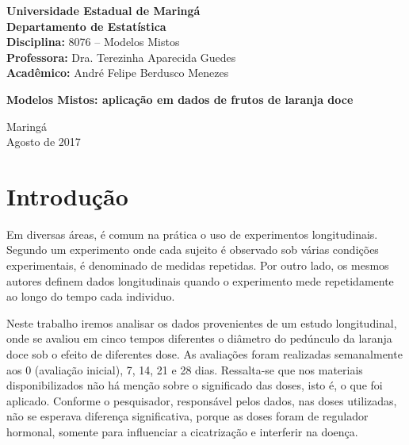 \documentclass[12pt,a4paper,final]{article}
\begin{document}
\begin{titlepage}
	\begin{flushleft}
		\Large\textbf{Universidade Estadual de Maringá} \\
		\large\textbf{Departamento de Estatística} \\
		\textbf{Disciplina:} 8076 -- Modelos Mistos\\
		\textbf{Professora:} Dra. Terezinha Aparecida Guedes \\
		\textbf{Acadêmico:} André Felipe Berdusco Menezes 
	\end{flushleft}
	
	\vspace{180pt}
	\begin{center}
		\LARGE\textbf{Modelos Mistos: aplicação em dados de frutos de laranja doce}
	\end{center}
	
	\vspace{78pt}
	\begin{center}
		\vspace{180pt}
		\textrm{Maringá \\ 
			Agosto de 2017}
	\end{center}
\end{titlepage}
	
\onehalfspacing
\tableofcontents

\newpage

\section{Introdução}
Em diversas áreas, é comum na prática o uso de experimentos longitudinais. 
Segundo  um experimento onde cada sujeito é observado 
sob várias condições experimentais, é denominado de medidas repetidas. Por outro lado,
os mesmos autores definem dados longitudinais quando o experimento mede repetidamente 
ao longo do tempo cada individuo.

Neste trabalho iremos analisar os dados provenientes de um estudo longitudinal,
onde se avaliou em cinco tempos diferentes o diâmetro do pedúnculo da laranja doce sob
o efeito de diferentes dose. As avaliações foram realizadas semanalmente
aos 0 (avaliação inicial), 7, 14, 21 e 28 dias. Ressalta-se que nos materiais disponibilizados
não há menção sobre o significado das doses, isto é, o que foi aplicado. Conforme o pesquisador, 
responsável pelos dados, nas doses utilizadas, não se esperava diferença significativa, 
porque as doses foram de regulador hormonal, somente para influenciar a cicatrização e interferir na doença.
\end{document}
